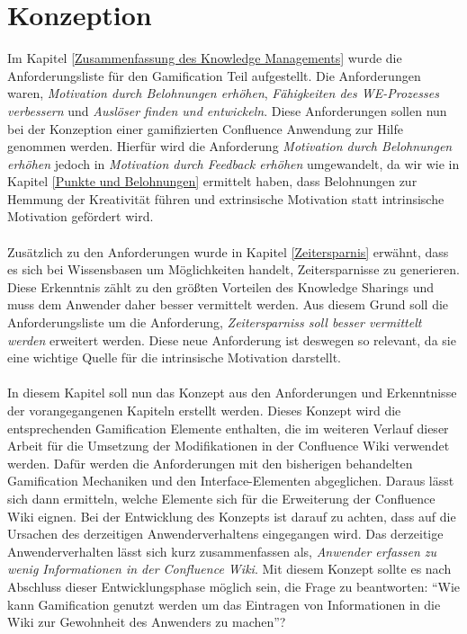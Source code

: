 \documentclass[a4paper,12pt]{scrartcl}
\begin{document}
\section{Konzeption}
\label{Konzeption}
Im Kapitel \ref{Zusammenfassung des Knowledge Managements} wurde die Anforderungsliste für den Gamification Teil aufgestellt. Die Anforderungen waren, \textit{Motivation durch Belohnungen erhöhen}, \textit{Fähigkeiten des WE-Prozesses verbessern} und \textit{Auslöser finden und entwickeln}. Diese Anforderungen sollen nun bei der Konzeption einer gamifizierten Confluence Anwendung zur Hilfe genommen werden. Hierfür wird die Anforderung \textit{Motivation durch Belohnungen erhöhen} jedoch in \textit{Motivation durch Feedback erhöhen} umgewandelt, da wir wie in Kapitel \ref{Punkte und Belohnungen} ermittelt haben, dass Belohnungen zur Hemmung der Kreativität führen und extrinsische Motivation statt intrinsische Motivation gefördert wird.
\\\\
Zusätzlich zu den Anforderungen wurde in Kapitel \ref{Zeitersparnis} erwähnt, dass es sich bei Wissensbasen um Möglichkeiten handelt, Zeitersparnisse zu generieren. Diese Erkenntnis zählt zu den größten Vorteilen des Knowledge Sharings und muss dem Anwender daher besser vermittelt werden. Aus diesem Grund soll die Anforderungsliste um die Anforderung, \textit{Zeitersparniss soll besser vermittelt werden} erweitert werden. Diese neue Anforderung ist deswegen so relevant, da sie eine wichtige Quelle für die intrinsische Motivation darstellt.
\\\\
In diesem Kapitel soll nun das Konzept aus den Anforderungen und Erkenntnisse der vorangegangenen Kapiteln erstellt werden. Dieses Konzept wird die entsprechenden Gamification Elemente enthalten, die im weiteren Verlauf dieser Arbeit für die Umsetzung der Modifikationen in der Confluence Wiki verwendet werden. Dafür werden die Anforderungen mit den bisherigen behandelten Gamification Mechaniken und den Interface-Elementen abgeglichen. Daraus lässt sich dann ermitteln, welche Elemente sich für die Erweiterung der Confluence Wiki eignen. Bei der Entwicklung des Konzepts ist darauf zu achten, dass auf die Ursachen des derzeitigen Anwenderverhaltens eingegangen wird. Das derzeitige Anwenderverhalten lässt sich kurz zusammenfassen als, \textit{Anwender erfassen zu wenig Informationen in der Confluence Wiki}. Mit diesem Konzept sollte es nach Abschluss dieser Entwicklungsphase möglich sein, die Frage zu beantworten: \enquote{Wie kann Gamification genutzt werden um das Eintragen von Informationen in die Wiki zur Gewohnheit des Anwenders zu machen}?  


 

 









 























  
\newpage
\listoftables
\listoffigures
\newpage

\end{document}
